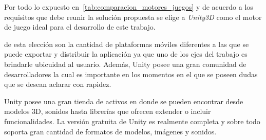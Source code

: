 \restoregeometry

Por todo lo expuesto en~\ref{tab:comparacion_motores_juegos} y de acuerdo a los
requisitos que debe reunir la solución propuesta se elige a \textit{Unity3D} como el
motor de juego ideal para el desarrollo de este trabajo.

 de esta elección son
la cantidad de plataformas móviles diferentes a las que se puede exportar y
distribuir la aplicación ya que uno de los ejes del trabajo es brindarle
ubicuidad al usuario. Además, Unity posee una gran comunidad de desarrolladores
la cual es importante en los momentos en el que se poseen dudas que se desean
aclarar con rapidez.

Unity posee una gran tienda de activos en donde se pueden encontrar desde
modelos 3D, sonidos hasta librerías que ofrecen extender o incluir
funcionalidades. La versión gratuita de Unity es realmente completa y sobre todo
soporta gran cantidad de formatos de modelos, imágenes y sonidos.
